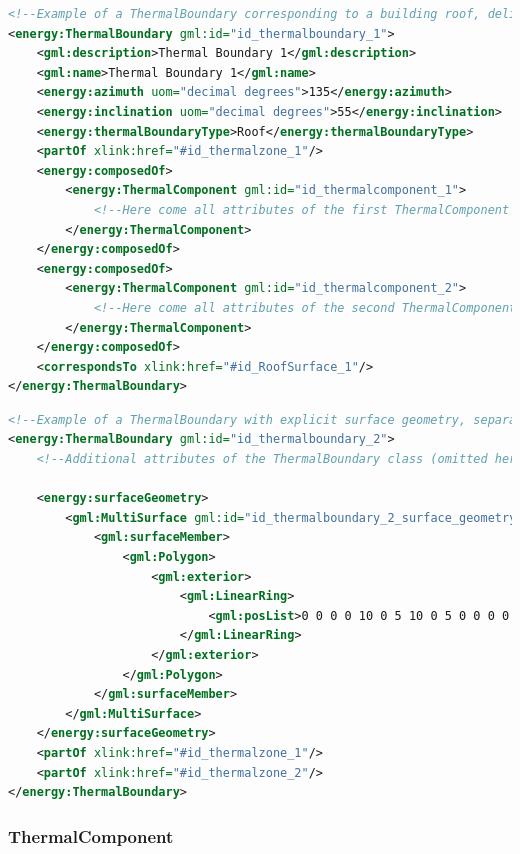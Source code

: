 \documentclass[a4paper,12pt]{article}
\begin{document}
\begin{lstlisting}[language=XML]
<!--Example of a ThermalBoundary corresponding to a building roof, delimiting a thermal zone -->
<energy:ThermalBoundary gml:id="id_thermalboundary_1">
    <gml:description>Thermal Boundary 1</gml:description>
    <gml:name>Thermal Boundary 1</gml:name>
    <energy:azimuth uom="decimal degrees">135</energy:azimuth>
    <energy:inclination uom="decimal degrees">55</energy:inclination>
    <energy:thermalBoundaryType>Roof</energy:thermalBoundaryType>
    <partOf xlink:href="#id_thermalzone_1"/>
    <energy:composedOf>
        <energy:ThermalComponent gml:id="id_thermalcomponent_1">
            <!--Here come all attributes of the first ThermalComponent (omitted here)-->
        </energy:ThermalComponent>
    </energy:composedOf>
    <energy:composedOf>
        <energy:ThermalComponent gml:id="id_thermalcomponent_2">
            <!--Here come all attributes of the second ThermalComponent (omitted here)-->
        </energy:ThermalComponent>
    </energy:composedOf>
    <correspondsTo xlink:href="#id_RoofSurface_1"/>
</energy:ThermalBoundary>
\end{lstlisting}

\begin{lstlisting}[language=XML]
<!--Example of a ThermalBoundary with explicit surface geometry, separating two thermal zones -->
<energy:ThermalBoundary gml:id="id_thermalboundary_2">
    <!--Additional attributes of the ThermalBoundary class (omitted here)-->

    <energy:surfaceGeometry>
        <gml:MultiSurface gml:id="id_thermalboundary_2_surface_geometry" srsName="EPSG:31256" srsDimension="3">
            <gml:surfaceMember>
                <gml:Polygon>
                    <gml:exterior>
                        <gml:LinearRing>
                            <gml:posList>0 0 0 0 10 0 5 10 0 5 0 0 0 0 0</gml:posList>
                        </gml:LinearRing>
                    </gml:exterior>
                </gml:Polygon>
            </gml:surfaceMember>
        </gml:MultiSurface>
    </energy:surfaceGeometry>
    <partOf xlink:href="#id_thermalzone_1"/>
    <partOf xlink:href="#id_thermalzone_2"/>
</energy:ThermalBoundary>
\end{lstlisting}

\subsubsection{ThermalComponent}\label{thermalcomponent}
\end{document}
